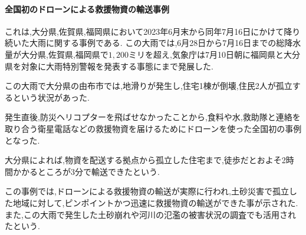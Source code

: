 \documentclass{article}[jsarticle]
\begin{document}
\paragraph{全国初のドローンによる救援物資の輸送事例}
これは,大分県,佐賀県,福岡県において2023年6月末から同年7月16日にかけて降り続いた大雨に関する事例である.
この大雨では,6月28日から7月16日までの総降水量が大分県,佐賀県,福岡県で$1,200$ミリを超え,気象庁は7月10日朝に福岡県と大分県を対象に大雨特別警報を発表する事態にまで発展した.\par
この大雨で大分県の由布市では,地滑りが発生し,住宅1棟が倒壊,住民2人が孤立するという状況があった.\par 
発生直後,防災ヘリコプターを飛ばせなかったことから,食料や水,救助隊と連絡を取り合う衛星電話などの救援物資を届けるためにドローンを使った全国初の事例となった.\par 
大分県によれば,物資を配送する拠点から孤立した住宅まで,徒歩だとおよそ2時間かかるところが3分で輸送できたという.\par
この事例では,ドローンによる救援物資の輸送が実際に行われ,土砂災害で孤立した地域に対して,ピンポイントかつ迅速に救援物資の輸送ができた事が示された.
また,この大雨で発生した土砂崩れや河川の氾濫の被害状況の調査でも活用されたという.\cite{news03}
\end{document}

